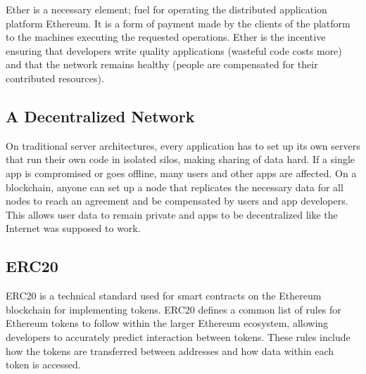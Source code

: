 Ether is a necessary element; fuel for operating the distributed application platform Ethereum. It is a form of payment made by the clients of the platform to the machines executing the requested operations. Ether is the incentive ensuring that developers write quality applications (wasteful code costs more) and that the network remains healthy (people are compensated for their contributed resources).

\subsection{A Decentralized Network}

On traditional server architectures, every application has to set up its own servers that run their own code in isolated silos, making sharing of data hard. If a single app is compromised or goes offline, many users and other apps are affected. On a blockchain, anyone can set up a node that replicates the necessary data for all nodes to reach an agreement and be compensated by users and app developers. This allows user data to remain private and apps to be decentralized like the Internet was supposed to work.

\subsection{ERC20}

ERC20 is a technical standard used for smart contracts on the Ethereum blockchain for implementing tokens. ERC20 defines a common list of rules for Ethereum tokens to follow within the larger Ethereum ecosystem, allowing developers to accurately predict interaction between tokens. These rules include how the tokens are transferred between addresses and how data within each token is accessed.
